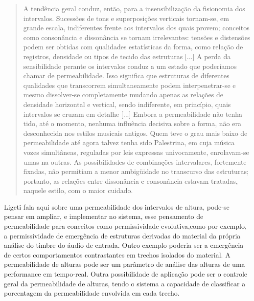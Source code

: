\documentclass{ppgmus}
\begin{document}
\begin{quote}
  A tendência geral conduz, então, para a insensibilização da
  fisionomia dos intervalos. Sucessões de tons e superposições
  verticais tornam-se, em grande escala, indiferentes frente aos
  intervalos dos quais provem; conceitos como consonância e
  dissonância se tornam irrelevantes: tensões e distensões podem ser
  obtidas com qualidades estatísticas da forma, como relação de
  registros, densidade ou tipos de tecido das estruturas [...] A perda
  da sensibilidade perante os intervalos conduz a um estado que
  poderíamos chamar de permeabilidade. Isso significa que estruturas
  de diferentes qualidades que transcorrem simultaneamente podem
  interpenetrar-se e mesmo dissolver-se completamente mudando apenas
  as relações de densidade horizontal e vertical, sendo indiferente,
  em princípio, quais intervalos se cruzam em detalhe [...] Embora a
  permeabilidade não tenha tido, até o momento, nenhuma influência
  decisiva sobre a forma, não era desconhecida nos estilos musicais
  antigos. Quem teve o grau mais baixo de permeabilidade até agora
  talvez tenha sido Palestrina, em cuja música vozes simultâneas,
  reguladas por leis expressas univocamente, enrolavam-se umas na
  outras. As possibilidades de combinações intervalares, fortemente
  fixadas, não permitiam a menor ambigüidade no transcurso das
  estruturas; portanto, as relações entre dissonância e consonância
  estavam tratadas, naquele estilo, com o maior cuidado. \cite{ligeti58:transformacoes}
\end{quote}
 
Ligeti fala aqui sobre uma permeabilidade dos intervalos de altura,
pode-se pensar em ampliar, e implementar no sistema, esse pensamento
de permeabilidade para conceitos como permissividade evolutiva,como por
exemplo, a permissividade de emergência de estruturas derivadas do material 
da própria análise do timbre do áudio de entrada. Outro exemplo poderia ser a 
emergência de certos comportamentos contrastantes em trechos isolados do material.
A permeabilidade de alturas pode ser um parâmetro de análise das alturas 
de uma performance em tempo-real. Outra possibilidade de aplicação pode ser o
controle geral da permeabilidade de alturas, tendo o sistema a capacidade de
classificar a porcentagem da permeabilidade envolvida em cada trecho. 
\end{document}
